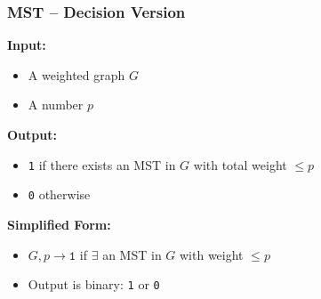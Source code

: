 \begin{frame}
  \frametitle{MST – Decision Version}
  
  \textbf{Input:}
  \begin{itemize}
      \item A weighted graph $G$
      \vspace{3pt}
      \item A number $p$
  \end{itemize}
  
  \vspace{0.3cm}
  
  \textbf{Output:}
  \begin{itemize}
      \item \texttt{1} if there exists an MST in $G$ with total weight $\leq p$
      \vspace{3pt}
      \item \texttt{0} otherwise
  \end{itemize}
  
  \vspace{0.5cm}
  
  \textbf{Simplified Form:}
  \begin{itemize}
      \item $G, p \rightarrow \texttt{1}$ \quad if $\exists$ an MST in $G$ with weight $\leq p$
      \vspace{3pt}
      \item Output is binary: \texttt{1} or \texttt{0}
  \end{itemize}
  
  \vspace{0.3cm}
    \end{frame}
    


